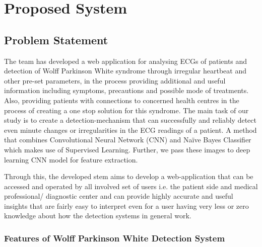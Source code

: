 \chapter{Proposed System}

 
\section{Problem Statement} 

The team has developed a web application for analysing ECGs of patients and detection of Wolff Parkinson White syndrome through irregular heartbeat and other pre-set parameters, in the process providing additional and useful information including symptoms, precautions and possible mode of treatments. Also, providing patients with connections to concerned health centres in the process of creating a one stop solution for this syndrome. The main task of our study is to create a detection-mechanism that can successfully and reliably detect even minute changes or irregularities in the ECG readings of a patient. A method that combines Convolutional Neural Network (CNN) and Naïve Bayes Classifier which makes use of Supervised Learning. Further, we pass these images to deep learning CNN model for feature extraction. 

Through this, the developed stem aims to develop a web-application that can be accessed and operated by all involved set of users i.e. the patient side and medical professional/ diagnostic center and can provide highly accurate and useful insights that are fairly easy to interpret even for a user having very less or zero knowledge about how the detection systems in general work. 

\subsection{Features of Wolff Parkinson White Detection System}  

